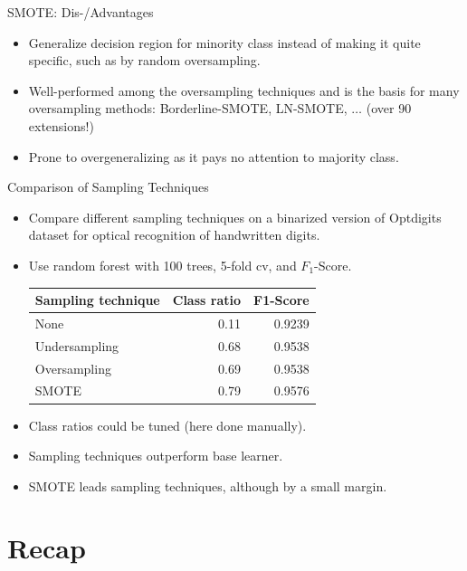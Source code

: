 \documentclass[11pt,compress,t,notes=noshow, aspectratio=169, xcolor=table]{beamer}
\begin{document}
\begin{frame}{SMOTE: Dis-/Advantages}

    \begin{itemize}
    
        \item Generalize decision region for minority class instead of making it quite specific, such as by random oversampling. 
        
        \item Well-performed among the oversampling techniques and is the basis for many oversampling methods: Borderline-SMOTE, LN-SMOTE, $\ldots$ (over 90 extensions!)
    
        \item Prone to overgeneralizing as it pays no attention to majority class.

    \end{itemize}		

\end{frame}

\begin{frame}{Comparison of Sampling Techniques}

    \begin{itemize}
    
        \item Compare different sampling techniques on a binarized version of Optdigits dataset for optical recognition of handwritten digits.
    
        \item Use random forest with 100 trees, 5-fold cv, and $F_1$-Score. %
           \begin{center}
             \begin{tabular}{lrr}
             \toprule
             Sampling technique & Class ratio &F1-Score\\
             \midrule
             None & 0.11 &0.9239\\
             Undersampling & 0.68 & 0.9538\\
             Oversampling & 0.69& 0.9538\\
             SMOTE & 0.79 & 0.9576\\
             \bottomrule
             \end{tabular}    
            \end{center}
            
        \item Class ratios could be tuned (here done manually).
        \item Sampling techniques outperform base learner. 
        \item SMOTE leads sampling techniques, although by a small margin.

    \end{itemize}		

\end{frame}

\section{Recap}

\endlecture
\end{document}
